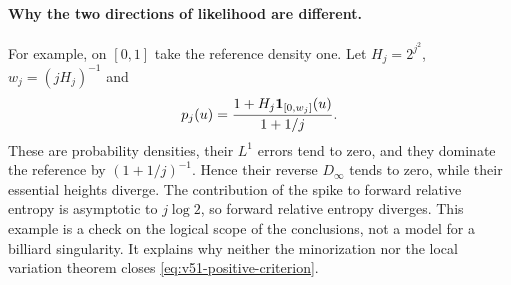 \paragraph{Why the two directions of likelihood are different.}
For example, on $[0,1]$ take the reference density one. Let
$H_j=2^{j^2}$, $w_j=(jH_j)^{-1}$ and
\[
 p_j(u)=\frac{1+H_j\mathbf1_{[0,w_j]}(u)}{1+1/j}.
\]
These are probability densities, their $L^1$ errors tend to zero,
and they dominate the reference by $(1+1/j)^{-1}$. Hence their
reverse $D_\infty$ tends to zero, while their essential heights
diverge. The contribution of the spike to forward relative entropy
is asymptotic to $j\log2$, so forward relative entropy diverges.
This example is a check on the logical scope of the conclusions,
not a model for a billiard singularity. It explains why neither the
minorization nor the local variation theorem closes
\eqref{eq:v51-positive-criterion}.
